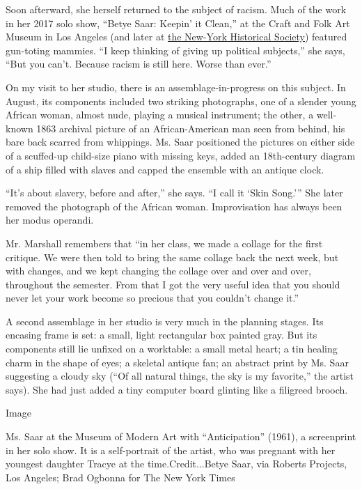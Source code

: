 Soon afterward, she herself returned to the subject of racism. Much of
the work in her 2017 solo show, ``Betye Saar: Keepin' it Clean,'' at the
Craft and Folk Art Museum in Los Angeles (and later at
\href{https://www.nyhistory.org/exhibitions/betye-saar-keepin\%E2\%80\%99-it-clean}{the
New-York Historical Society}) featured gun-toting mammies. ``I keep
thinking of giving up political subjects,'' she says, ``But you can't.
Because racism is still here. Worse than ever.''

On my visit to her studio, there is an assemblage-in-progress on this
subject. In August, its components included two striking photographs,
one of a slender young African woman, almost nude, playing a musical
instrument; the other, a well-known 1863 archival picture of an
African-American man seen from behind, his bare back scarred from
whippings. Ms. Saar positioned the pictures on either side of a
scuffed-up child-size piano with missing keys, added an 18th-century
diagram of a ship filled with slaves and capped the ensemble with an
antique clock.

``It's about slavery, before and after,'' she says. ``I call it `Skin
Song.''' She later removed the photograph of the African woman.
Improvisation has always been her modus operandi.

Mr. Marshall remembers that ``in her class, we made a collage for the
first critique. We were then told to bring the same collage back the
next week, but with changes, and we kept changing the collage over and
over and over, throughout the semester. From that I got the very useful
idea that you should never let your work become so precious that you
couldn't change it.''

A second assemblage in her studio is very much in the planning stages.
Its encasing frame is set: a small, light rectangular box painted gray.
But its components still lie unfixed on a worktable: a small metal
heart; a tin healing charm in the shape of eyes; a skeletal antique fan;
an abstract print by Ms. Saar suggesting a cloudy sky (``Of all natural
things, the sky is my favorite,'' the artist says). She had just added a
tiny computer board glinting like a filigreed brooch.

Image

Ms. Saar at the Museum of Modern Art with ``Anticipation'' (1961), a
screenprint in her solo show. It is a self-portrait of the artist, who
was pregnant with her youngest daughter Tracye at the
time.Credit...Betye Saar, via Roberts Projects, Los Angeles; Brad
Ogbonna for The New York Times

